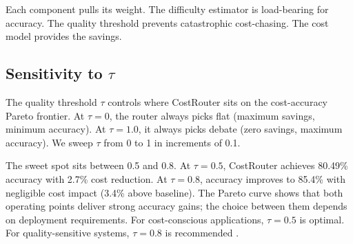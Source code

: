 Each component pulls its weight. The difficulty estimator is load-bearing for accuracy. The quality threshold prevents catastrophic cost-chasing. The cost model provides the savings.

\subsection{Sensitivity to $\tau$}\label{sensitivity-to-tau}

The quality threshold $\tau$ controls where CostRouter sits on the cost-accuracy Pareto frontier. At $\tau = 0$, the router always picks flat (maximum savings, minimum accuracy). At $\tau = 1.0$, it always picks debate (zero savings, maximum accuracy). We sweep $\tau$ from 0 to 1 in increments of 0.1.

The sweet spot sits between 0.5 and 0.8. At $\tau = 0.5$, CostRouter achieves 80.49\% accuracy with 2.7\% cost reduction. At $\tau = 0.8$, accuracy improves to 85.4\% with negligible cost impact (3.4\% above baseline). The Pareto curve shows that both operating points deliver strong accuracy gains; the choice between them depends on deployment requirements. For cost-conscious applications, $\tau = 0.5$ is optimal. For quality-sensitive systems, $\tau = 0.8$ is recommended \cite{vsakota_2024}.
